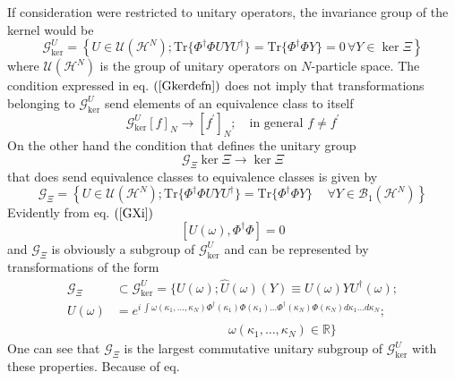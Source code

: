 \documentclass[aps,preprint]{revtex4}%
\begin{document}
If consideration were restricted to unitary operators, the invariance group of
the kernel would be
\begin{equation}
\mathcal{G}_{\ker}^{U}=\left\{  U\in\mathcal{U}(\mathcal{H}^{N});\mathrm{Tr}%
\{\Phi^{\dagger}\Phi UYU^{\dagger}\}=\mathrm{Tr}\{\Phi^{\dagger}\Phi
Y\}=0\,\forall Y\in\ker\Xi\right\}  \label{Gkerdefn}%
\end{equation}
where $\mathcal{U}(\mathcal{H}^{N})$ is the group of unitary operators on
$N$-particle space. The condition expressed in eq. $\left(  \ref{Gkerdefn}%
\right)  $ does not imply that transformations belonging to $\mathcal{G}%
_{\ker}^{U}$ send elements of an equivalence class to itself
\begin{equation}
\mathcal{G}_{\ker}^{U}\left[  f\right]  _{N}\rightarrow\left[  f^{\prime
}\right]  _{N};\quad\text{in general }f\neq f^{\prime}%
\end{equation}
On the other hand the condition that defines the unitary group
\begin{equation}
\mathcal{G}_{\Xi}\ker\Xi\rightarrow\ker\Xi
\end{equation}
that does send equivalence classes to equivalence classes is given by
\begin{equation}
\mathcal{G}_{\Xi}=\left\{  U\in\mathcal{U}(\mathcal{H}^{N});\mathrm{Tr}%
\{\Phi^{\dagger}\Phi UYU^{\dagger}\}=\mathrm{Tr}\{\Phi^{\dagger}\Phi
Y\}\quad\,\forall Y\in\mathcal{B}_{1}\left(  \mathcal{H}^{N}\right)  \right\}
\label{GXi}%
\end{equation}
Evidently from eq. $\left(  \ref{GXi}\right)  $
\begin{equation}
\left[  U(\omega),\Phi^{\dagger}\Phi\right]  =0
\end{equation}
and $\mathcal{G}_{\Xi}$ is obviously a subgroup of $\mathcal{G}_{\ker}^{U}$
and can be represented by transformations of the form
\begin{align}
\mathcal{G}_{\Xi}  &  \subset\mathcal{G}_{\ker}^{U}=\{U(\omega);\hat{U}%
(\omega)(Y)\equiv U(\omega)YU^{\dagger}(\omega);\nonumber\\
U(\omega)  &  =e^{i\,\int\omega(\kappa_{1},\ldots,\kappa_{N})\Phi^{\dagger
}(\kappa_{1})\Phi(\kappa_{1})\ldots\Phi^{\dagger}(\kappa_{N})\Phi(\kappa
_{N})d\kappa_{1}\ldots d\kappa_{N}};\nonumber\\
&  \qquad\qquad\qquad\qquad\quad\omega(\kappa_{1},\ldots,\kappa_{N}%
)\in\mathbb{R}\} \label{GXidefn}%
\end{align}
One can see that $\mathcal{G}_{\Xi}$ is the largest commutative unitary
subgroup of $\mathcal{G}_{\ker}^{U}$ with these properties. Because of eq.
\end{document}

